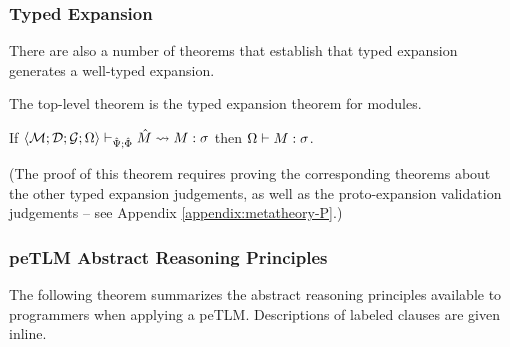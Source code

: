 \subsubsection{Typed Expansion}
There are also a number of theorems that establish that typed expansion generates a well-typed expansion.

The top-level theorem is the typed expansion theorem for modules. 

\begingroup
\def\thetheorem{\ref{thm:module-expansion-P}}
\begin{theorem}
If $\langle \mathcal{M}; \mathcal{D}; \mathcal{G}; \Omega \rangle \vdash_{\hat{\Psi}; \hat\Phi} {\hat M} \leadsto M : \sigma$ then $\Omega \vdash M : \sigma$.
\end{theorem}
\endgroup

(The proof of this theorem requires proving the corresponding theorems about the other typed expansion judgements, as well as the proto-expansion validation judgements -- see Appendix \ref{appendix:metatheory-P}.)

\subsubsection{peTLM Abstract Reasoning Principles}
The following theorem summarizes the abstract reasoning principles available to programmers when applying a peTLM. Descriptions of labeled clauses are given inline.

